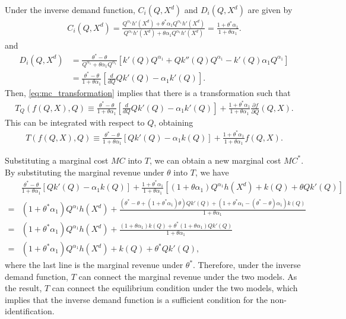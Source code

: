 \documentclass[11pt, a4paper]{article}
\theoremstyle{remark}
\begin{document}
Under the inverse demand function, $C_i(Q, X^{d})$ and $D_i(Q, X^{d})$ are given by
\begin{align}
    C_i(Q, X^{d}) = \frac{Q^{\alpha_1}h'(X^{d}) + \theta^{*}\alpha_1Q^{\alpha_1}h'(X^{d})}{Q^{\alpha_1}h'(X^{d}) + \theta \alpha_1 Q^{\alpha_1}h'(X^{d})} = \frac{1 + \theta^{*}\alpha_1}{1 + \theta\alpha_1}.
\end{align}
and
\begin{align}
    D_i(Q, X^{d}) & = \frac{\theta^{*} - \theta}{Q^{\alpha_1} + \theta \alpha_1Q^{\alpha_1}} \left[ k'(Q)Q^{\alpha_1} + Qk''(Q) Q^{\alpha_1} - k'(Q)\alpha_1Q^{\alpha_1} \right]\\
    &= \frac{\theta^{*} - \theta}{1 + \theta\alpha_1} \left[\frac{d}{dQ}Qk'(Q)  -\alpha_1k'(Q) \right].
\end{align}
Then, \eqref{eq:mc_transformation} implies that there is a transformation such that
\begin{align}
    T_Q\left(f(Q,X), Q\right) \equiv \frac{\theta^{*} - \theta}{1 + \theta\alpha_1}\left[\frac{d}{dQ}Qk'(Q)  -\alpha_1k'(Q) \right]+ \frac{1 + \theta^{*}\alpha_1}{1 + \theta\alpha_1} \frac{\partial f}{\partial Q}(Q, X).
\end{align}
This can be integrated with respect to $Q$, obtaining
\begin{align}
    T\left(f(Q,X), Q\right) \equiv \frac{\theta^{*} - \theta}{1 + \theta\alpha_1} \left[Qk'(Q) - \alpha_1k(Q) \right] + \frac{1 + \theta^{*}\alpha_1}{1 + \theta\alpha_1} f(Q, X).
\end{align}

Substituting a marginal cost $MC$ into $T$, we can obtain a new marginal cost $MC^{*}$.
By substituting the marginal revenue under $\theta$ into $T$, we have
\begin{align}
    & \frac{\theta^{*} - \theta}{1 + \theta\alpha_1} \left[Qk'(Q) - \alpha_1k(Q) \right] + \frac{1 + \theta^{*}\alpha_1}{1 + \theta\alpha_1} \left[(1+\theta\alpha_1) Q^{\alpha_1}h(X^{d}) + k(Q) + \theta Qk'(Q)\right]\\
    = & (1 + \theta^{*}\alpha_1)Q^{\alpha_1}h(X^{d}) + \frac{(\theta^{*} - \theta + (1 + \theta^{*}\alpha_1)\theta)Qk'(Q) + (1 + \theta^{*}\alpha_1 - (\theta^{*} - \theta)\alpha_1) k(Q)}{1 + \theta\alpha_1}\\
    = & (1 + \theta^{*}\alpha_1)Q^{\alpha_1}h(X^{d}) + \frac{(1 + \theta\alpha_1) k(Q) + \theta^{*}(1 + \theta\alpha_1)Qk'(Q) }{1 + \theta\alpha_1}\\
    = & (1 + \theta^{*}\alpha_1)Q^{\alpha_1}h(X^{d}) +k(Q) + \theta^{*}Qk'(Q),
\end{align}
where the last line is the marginal revenue under $\theta^{*}$.
Therefore, under the inverse demand function, $T$ can connect the marginal revenue under the two models.
As the result, $T$ can connect the equilibrium condition under the two models, which implies that the inverse demand function is a sufficient condition for the non-identification.
\end{document}
